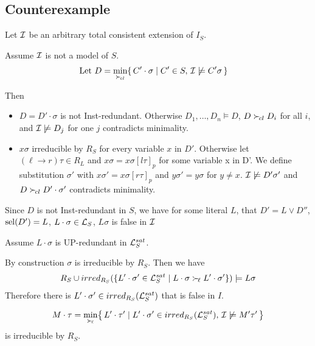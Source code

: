\documentclass[%
handout,
]{beamer}
\begin{document}
\subsection{Counterexample}
\begin{frame}
    Let $\mathcal{I}$ be an arbitrary total consistent extension of $I_S$.
    \vspace{1.4em}

    Assume $\mathcal{I}$ is not a model of $S$.
    \begin{align*}
        \text{Let }
        D &= \min_{\mathrel\succ_{\!cl}}\{\,
        C'\cdot\sigma \mid C'\in S,\,
        \mathcal{I}\not\models C'\sigma\,
        \}
    \end{align*}

    Then
    \begin{itemize}
        \item $D = D'\cdot\sigma$ is not Inst-redundant. Otherwise
        $D_1,\ldots,D_n\models D$, $D\mathrel\succ_{\!cl} D_i$ for all $i$,
        and $\mathcal{I}\not\models D_j$ for one $j$ contradicts minimality.
        \item $x\sigma$ irreducible by $R_S$ for every variable $x$ in $D'$.
        Otherwise let $(\ell\to r)\tau\in R_L$ and $x\sigma = x\sigma[l\tau]_p$ for some variable x in D'.
        We define substitution $\sigma'$ with $x\sigma' = x\sigma[r\tau]_p$ and $y\sigma' = y\sigma$ for $y\neq x$.
        $\mathcal{I}\not\models D'\sigma'$ and $D\mathrel\succ_{\!cl} D'\cdot\sigma'$ contradicts minimality.
    \end{itemize}


\end{frame}

\begin{frame}
    Since $D$ is not Inst-redundant in $S$,
    we have for some literal $L$,
    that $D' = L\lor D''$, $\operatorname{sel}(D') = L$, $L\cdot\sigma\in\mathcal{L}_S$,
    $L\sigma$ is false in $\mathcal{I}$

    Assume $L\cdot\sigma$ is UP-redundant in $\mathcal{L}_S^{sat}$.

    By construction $\sigma$ is irreducible by $R_S$. Then we have
    \begin{align*}
        R_S \cup irred_{R_S}(
            \{
            L'\cdot\sigma'\in\mathcal{L}_S^{sat}
            \mid
            L\cdot\sigma \mathrel\succ_{\!\ell} L'\cdot\sigma'
            \}
        )
        \models
        L\sigma
    \end{align*}
    Therefore there is $L'\cdot\sigma'\in irred_{R_S}(\mathcal{L}_S^{sat})$ that is false in $I$.
    \vspace{0.7em}


    \begin{gather*}
        M\cdot\tau = \min_{\mathrel\succ_{\!\ell}}\!
\left\{\,
    L'\cdot\tau' \mid
    L'\cdot\sigma' \in irred_{R_S}(\mathcal{L}_S^{sat}),\,
    \mathcal{I} \not\models M'\tau'\,
\right\}
    \end{gather*}
    is irreducible by $R_S$.

\end{frame}
\end{document}

